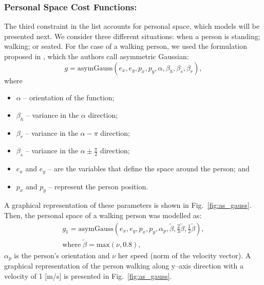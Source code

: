 \documentclass[5p,time]{elsarticle}
\begin{document}
\subsubsection{Personal Space Cost Functions:}\label{sec:personal_space_constraint}
The third constraint in the list accounts for personal space, which models will be presented next. We consider three different situations: when a person is standing; walking; or seated. For the case of a walking person, we used the formulation proposed in \cite{34}, which the authors call asymmetric Gaussian:
\begin{equation}
g = \text{asymGauss}(e_x,e_y,p_x,p_y,\alpha,\beta_h,\beta_s,\beta_r),
\end{equation}
where
\begin{itemize}
	\item{$\alpha$  -- orientation of the function;} 
	\item{$\beta_h$ -- variance in the $\alpha$ direction;} 
	\item{$\beta_r$ -- variance in the $\alpha - \pi$ direction;} 
	\item{$\beta_s$ -- variance in the $\alpha \pm \frac{\pi}{2}$ direction;} 
	\item{$e_x$ and $e_y$ -- are the variables that define the space around the person; and} 
	\item{$p_x$ and $p_y$} -- represent the person position.
\end{itemize}
A graphical representation of these parameters is shown in Fig.~\ref{fig:as_gauss}. Then, the personal space of a walking person was modelled as:
\begin{multline}
g_1 = \text{asymGauss}(e_x,e_y,p_x,p_y,\alpha_p,\widetilde{\beta},\frac{2}{3}\widetilde{\beta},\frac{1}{2}\widetilde{\beta}), \\ \text{where} \; \widetilde{\beta} = \text{max}\left(\nu, 0.8\right),
\label{eq:f1}
\end{multline}
$\alpha_p$ is the person's orientation and $\nu$ her speed (norm of the velocity vector). A graphical representation of the person walking along y--axis direction with a velocity of 1 [m/s] is presented in Fig.~\ref{fig:as_gauss}.
\end{document}
